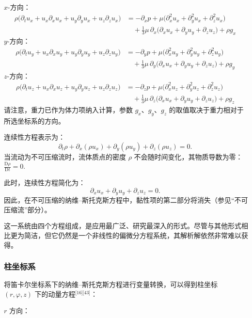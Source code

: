 $x$-方向：
$$
\begin{aligned}
\rho \big(
\partial_t u_x
+ u_x \partial_x u_x
+ u_y \partial_y u_x
+ u_z \partial_z u_x
\big)
&= -\partial_x p
+ \mu \big(
\partial_x^2 u_x
+ \partial_y^2 u_x
+ \partial_z^2 u_x
\big) \\
&\quad + \frac{1}{3} \mu \,\partial_x
\big(
\partial_x u_x
+ \partial_y u_y
+ \partial_z u_z
\big)
+ \rho g_x
\end{aligned}~
$$
$y$-方向：
$$
\begin{aligned}
\rho \big(
\partial_t u_y
+ u_x \partial_x u_y
+ u_y \partial_y u_y
+ u_z \partial_z u_y
\big)
&= -\partial_y p
+ \mu \big(
\partial_x^2 u_y
+ \partial_y^2 u_y
+ \partial_z^2 u_y
\big) \\
&\quad + \frac{1}{3} \mu \,\partial_y
\big(
\partial_x u_x
+ \partial_y u_y
+ \partial_z u_z
\big)
+ \rho g_y
\end{aligned}~
$$
$z$-方向：
$$
\begin{aligned}
\rho \big(
\partial_t u_z
+ u_x \partial_x u_z
+ u_y \partial_y u_z
+ u_z \partial_z u_z
\big)
&= -\partial_z p
+ \mu \big(
\partial_x^2 u_z
+ \partial_y^2 u_z
+ \partial_z^2 u_z
\big) \\
&\quad + \frac{1}{3} \mu \,\partial_z
\big(
\partial_x u_x
+ \partial_y u_y
+ \partial_z u_z
\big)
+ \rho g_z
\end{aligned}~
$$
请注意，重力已作为体力项纳入计算，参数 $g_x$、$g_y$、$g_z$ 的取值取决于重力相对于所选坐标系的方向。

连续性方程表示为：
$$
\partial_t \rho
+ \partial_x (\rho u_x)
+ \partial_y (\rho u_y)
+ \partial_z (\rho u_z)
= 0.~
$$
当流动为不可压缩流时，流体质点的密度 $\rho$ 不会随时间变化，其物质导数为零：$\frac{\mathrm{D} \rho}{\mathrm{D} t} = 0$.

此时，连续性方程简化为：
$$
\partial_x u_x
+ \partial_y u_y
+ \partial_z u_z
= 0.~
$$
因此，在不可压缩的纳维–斯托克斯方程中，黏性项的第二部分将消失（参见“不可压缩流”部分）。

这一系统由四个方程组成，是应用最广泛、研究最深入的形式。尽管与其他形式相比更为简洁，但它仍然是一个非线性的偏微分方程系统，其解析解依然非常难以获得。
\subsubsection{柱坐标系}
将笛卡尔坐标系下的纳维–斯托克斯方程进行变量转换，可以得到柱坐标 $(r, \varphi, z)$ 下的动量方程\(^\text{[16][43]}\)：

$r$ 方向：

